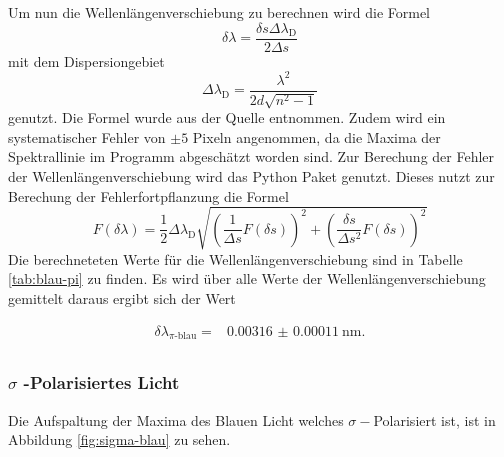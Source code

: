 Um nun die Wellenlängenverschiebung zu berechnen wird die Formel
\begin{equation}
    \delta \lambda = \frac{\delta s \Delta \lambda _\text{D}}{2\Delta s}
   \label{eq:Wellenlaengenverschiebung}
\end{equation}
mit dem Dispersiongebiet
\begin{equation*}
    \Delta \lambda _\text{D} = \frac{\lambda^2}{2d\sqrt{n^2-1}}
\end{equation*}
genutzt. Die Formel wurde aus der Quelle \cite[4]{anleitung} entnommen.
Zudem wird ein systematischer Fehler von $\pm 5$ Pixeln angenommen, da die Maxima der Spektrallinie im Programm \cite{paint3d} abgeschätzt worden sind.
Zur Berechung der Fehler der Wellenlängenverschiebung wird das Python Paket \cite{uncertainties} genutzt.
Dieses nutzt zur Berechung der Fehlerfortpflanzung die Formel
\begin{equation}
    F(\delta \lambda) = \frac{1}{2} \Delta \lambda _\text{D} \sqrt{\left (\frac{1}{\Delta s} F(\delta s) \right)^2 + \left ( \frac{\delta s}{\Delta s^2} F(\delta s) \right )^2}
    \label{eq:fehler_Wellenlängenverschiebung}
\end{equation}
Die berechneteten Werte für die Wellenlängenverschiebung sind in Tabelle \autoref{tab:blau-pi} zu finden.
Es wird über alle Werte der Wellenlängenverschiebung gemittelt daraus ergibt sich der Wert

\begin{align*}
    \delta \lambda _\text{$\pi$-blau} = & \SI{0.00316(011)}{\nano\meter}. \\
\end{align*}

\subsubsection{\boldmath\texorpdfstring{$\sigma$}{sigma} -Polarisiertes Licht}

Die Aufspaltung der Maxima des Blauen Licht welches $\sigma -$Polarisiert ist, ist in Abbildung \ref{fig:sigma-blau} zu sehen.

